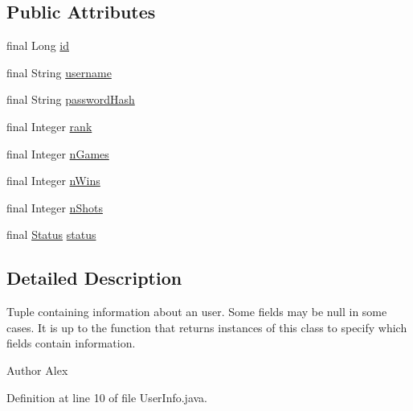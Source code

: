 \subsection*{Public Attributes}
\begin{DoxyCompactItemize}
\item 
final Long \hyperlink{classpt_1_1up_1_1fe_1_1lpro1613_1_1sharedlib_1_1tuples_1_1_user_info_a580b595dffa17b574af65299fd921deb}{id}
\item 
final String \hyperlink{classpt_1_1up_1_1fe_1_1lpro1613_1_1sharedlib_1_1tuples_1_1_user_info_adf5a1f573fe43fe1d9806fded73076c2}{username}
\item 
final String \hyperlink{classpt_1_1up_1_1fe_1_1lpro1613_1_1sharedlib_1_1tuples_1_1_user_info_a7b87b5f23fd1b1d43f535543dccfeedf}{password\+Hash}
\item 
final Integer \hyperlink{classpt_1_1up_1_1fe_1_1lpro1613_1_1sharedlib_1_1tuples_1_1_user_info_a05c2d0e090c34511a8fc358eea1eb50d}{rank}
\item 
final Integer \hyperlink{classpt_1_1up_1_1fe_1_1lpro1613_1_1sharedlib_1_1tuples_1_1_user_info_ace87e94c9ddadfe62cd42182142ee162}{n\+Games}
\item 
final Integer \hyperlink{classpt_1_1up_1_1fe_1_1lpro1613_1_1sharedlib_1_1tuples_1_1_user_info_a7c3c9b1356a8c63c8a8a2ac46d9fde11}{n\+Wins}
\item 
final Integer \hyperlink{classpt_1_1up_1_1fe_1_1lpro1613_1_1sharedlib_1_1tuples_1_1_user_info_aa892a3fde9c515586fb0218654581100}{n\+Shots}
\item 
final \hyperlink{enumpt_1_1up_1_1fe_1_1lpro1613_1_1sharedlib_1_1tuples_1_1_user_info_1_1_status}{Status} \hyperlink{classpt_1_1up_1_1fe_1_1lpro1613_1_1sharedlib_1_1tuples_1_1_user_info_a80e19822b28fa3b58eb7a5cb17363899}{status}
\end{DoxyCompactItemize}


\subsection{Detailed Description}
Tuple containing information about an user. Some fields may be null in some cases. It is up to the function that returns instances of this class to specify which fields contain information.

\begin{DoxyAuthor}{Author}
Alex 
\end{DoxyAuthor}


Definition at line 10 of file User\+Info.\+java.




